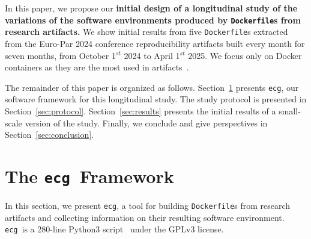 \documentclass[sigconf,natbib=false]{acmart}
\newcommand{\df}{\texttt{Dockerfile}}
\newcommand{\ecg}{\texttt{ecg}}
\newcommand{\todo}[1]{{\color{red}{TODO: #1}}}
\newcommand{\fmc}[1]{{}} %
\begin{document}
In this paper, we propose our \textbf{initial design of a longitudinal study of the variations of the software environments produced by \df s from research artifacts.}
We show initial results from five \df s extracted from the Euro-Par 2024 conference reproducibility artifacts built every month for seven months, from October 1$^{st}$ 2024 to April 1$^{st}$ 2025.
We focus only on Docker containers as they are the most used in artifacts~\cite{guilloteau2024longevity}.

% 

The remainder of this paper is organized as follows.
Section~\ref{sec:ecg} presents \ecg, our software framework for this longitudinal study.
The study protocol is presented in Section~\ref{sec:protocol}.
Section~\ref{sec:results} presents the initial results of a small-scale version of the study.
Finally, we conclude and give perspectives in Section~\ref{sec:conclusion}.

\section{The \ecg\ Framework}\label{sec:ecg}


In this section, we present \ecg, \fmc{Can we explain the acronym?} a tool for building \df s from research artifacts and collecting information on their resulting software environment.
\ecg\ is a 280-line Python3 script~\cite{ecg} under the GPLv3 license.
\end{document}
